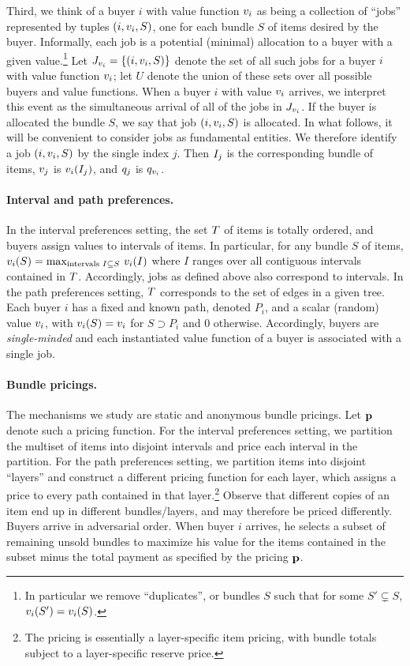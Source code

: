Third, we think of a buyer $i$ with value function $v_{i}$
as being a collection of ``jobs'' represented by tuples $(i,v_{i},S)$,
one for each bundle $S$ of items desired by the buyer. Informally,
each job is a potential (minimal) allocation to a buyer with a given
value.\footnote{In particular we remove ``duplicates'', or bundles $S$
  such that for some $S'\subsetneq S$, $v_{i}(S')=v_{i}(S)$.} Let
$J_{v_{i}} = \{(i,v_{i}, S)\}$ denote the set of all such jobs for a buyer
$i$ with value function $v_{i}$; let $U$ denote the union of these
sets over all possible buyers and value functions. When a buyer $i$
with value $v_{i}$ arrives, we interpret this event as the
simultaneous arrival of all of the jobs in $J_{v_{i}}$. If the buyer is
allocated the bundle $S$, we say that job $(i,v_{i},S)$ is
allocated. In what follows, it will be convenient to consider jobs as
fundamental entities. We therefore identify a job $(i,v_{i},S)$ by the
single index $j$.  Then ${I_{j}}$ is the corresponding bundle of items,
$v_{j}$ is $v_{i}(I_j)$, and ${q_{j}}$ is ${q_{v_{i}}}$.

\paragraph{Interval and path preferences.} In the interval preferences
setting, the set $T$ of items is totally ordered, and buyers
assign values to intervals of items. In particular, for any bundle $S$
of items,
$v_{i}(S) = \max_{\text{intervals } I \subseteq S} \, v_{i}(I)$ where
$I$ ranges over all contiguous intervals contained in
$T$. Accordingly, jobs as defined above also correspond to
intervals. In the path preferences setting, $T$ corresponds to
the set of edges in a given tree. Each buyer $i$ has a fixed and known
path, denoted $P_i$, and a scalar (random) value $v_{i}$, with
$v_{i}(S) = v_{i}$ for $S\supset P_i$ and $0$ otherwise. Accordingly,
buyers are {\em single-minded} and each instantiated value function of
a buyer is associated with a single job.

\paragraph{Bundle pricings.} The mechanisms we study are static and
anonymous bundle pricings. Let $\mathbf{p}$ denote such a pricing
function. For the interval preferences setting, we partition the
multiset of items into disjoint intervals and price each interval in
the partition. For the path preferences setting, we partition items
into disjoint ``layers'' and construct a different pricing function for
each layer, which assigns a price to every path contained in that
layer.\footnote{The pricing is essentially a layer-specific
  item pricing, with bundle totals subject to a layer-specific reserve
  price.} Observe that different copies of an item end up in different
bundles/layers, and may therefore be priced differently.  Buyers
arrive in adversarial order. When buyer $i$ arrives, he selects a
subset of remaining unsold bundles to maximize his value for the items
contained in the subset minus the total payment as specified by the
pricing $\mathbf{p}$.

